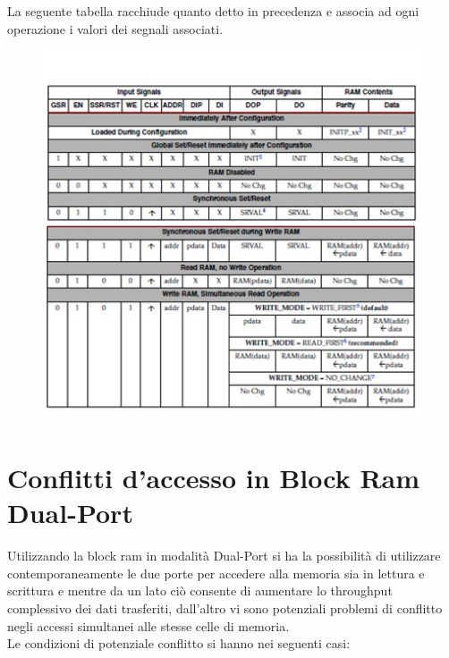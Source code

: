La seguente tabella racchiude quanto detto in precedenza e associa ad ogni operazione i valori dei segnali associati.

\begin{figure}[!h]
\centering
\includegraphics[width=\textwidth]{img/blockRam/operazioni.jpg}
\label{fig:set_ass}
\end{figure}

\section{Conflitti d'accesso in Block Ram Dual-Port}
Utilizzando la block ram in modalit\`a Dual-Port  si ha la possibilit\`a di utilizzare contemporaneamente le due porte per accedere alla memoria sia in lettura e scrittura e mentre da un lato ci\`o consente di aumentare lo throughput complessivo dei dati trasferiti, dall'altro vi sono potenziali problemi di conflitto negli accessi simultanei alle stesse celle di memoria.
\\
Le condizioni di potenziale conflitto si hanno nei seguenti casi:

